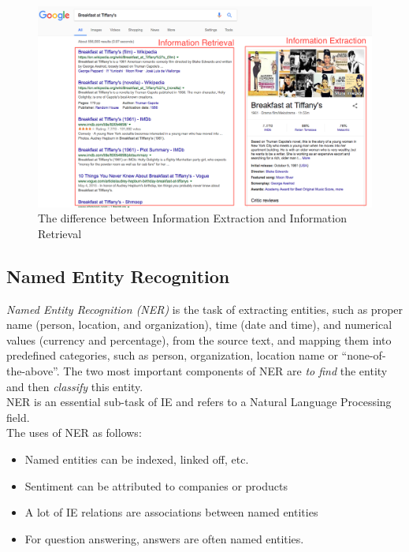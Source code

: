 \begin{figure}[h]
\begin{center}
\includegraphics[width=1.0\textwidth]{figures03/retrieval_extraction}
\caption{The difference between Information Extraction and Information Retrieval}
\label{fig:retrieval_extraction}
\end{center}
\end{figure}


\subsection{Named Entity Recognition}
\textit{Named Entity Recognition (NER)} is the task of extracting entities, such as proper name (person, location, and organization), time (date and time), and numerical values (currency and percentage), from the source text, and mapping them into predefined categories, such as person, organization, location name or “none-of-the-above”\cite{MaxEntropy}. The two most important components of NER are \textit{to find} the entity and then \textit{classify} this entity. \\

NER is an essential sub-task of IE and refers to a Natural Language Processing field. \\

The uses of NER as follows\cite{ManLect}:
\begin{itemize}
    \item Named entities can be indexed, linked off, etc.
    \item Sentiment can be attributed to companies or products
    \item A lot of IE relations are associations between named entities
    \item For question answering, answers are often named entities.
\end{itemize}

